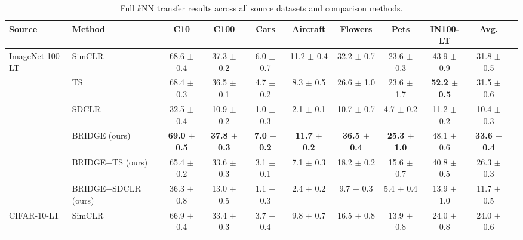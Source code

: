 \begin{table}[H]
\centering
\tiny
\setlength{\tabcolsep}{3.5pt}
\caption{Full $k$NN transfer results across all source datasets and comparison methods.}
\label{tab:app_sota_knn_full}
\begin{adjustbox}{width=\textwidth}
\begin{tabular}{l l c c c c c c c c c}
\toprule
Source & Method & C10 & C100 & Cars & Aircraft & Flowers & Pets & IN100-LT & Avg. \\
\midrule
ImageNet-100-LT & SimCLR & 68.6 {\scriptsize$\pm$ 0.4} & 37.3 {\scriptsize$\pm$ 0.2} & 6.0 {\scriptsize$\pm$ 0.7} & 11.2 {\scriptsize$\pm$ 0.4} & 32.2 {\scriptsize$\pm$ 0.7} & 23.6 {\scriptsize$\pm$ 0.3} & 43.9 {\scriptsize$\pm$ 0.9} & 31.8 {\scriptsize$\pm$ 0.5} \\
 & TS & 68.4 {\scriptsize$\pm$ 0.3} & 36.5 {\scriptsize$\pm$ 0.1} & 4.7 {\scriptsize$\pm$ 0.2} & 8.3 {\scriptsize$\pm$ 0.5} & 26.6 {\scriptsize$\pm$ 1.0} & 23.6 {\scriptsize$\pm$ 1.7} & \textbf{52.2 {\scriptsize$\pm$ 0.5}} & 31.5 {\scriptsize$\pm$ 0.6} \\
 & SDCLR & 32.5 {\scriptsize$\pm$ 0.4} & 10.9 {\scriptsize$\pm$ 0.2} & 1.0 {\scriptsize$\pm$ 0.3} & 2.1 {\scriptsize$\pm$ 0.1} & 10.7 {\scriptsize$\pm$ 0.7} & 4.7 {\scriptsize$\pm$ 0.2} & 11.2 {\scriptsize$\pm$ 0.2} & 10.4 {\scriptsize$\pm$ 0.3} \\
 & BRIDGE (ours) & \textbf{69.0 {\scriptsize$\pm$ 0.5}} & \textbf{37.8 {\scriptsize$\pm$ 0.3}} & \textbf{7.0 {\scriptsize$\pm$ 0.2}} & \textbf{11.7 {\scriptsize$\pm$ 0.2}} & \textbf{36.5 {\scriptsize$\pm$ 0.4}} & \textbf{25.3 {\scriptsize$\pm$ 1.0}} & 48.1 {\scriptsize$\pm$ 0.6} & \textbf{33.6 {\scriptsize$\pm$ 0.4}} \\
 & BRIDGE+TS (ours) & 65.4 {\scriptsize$\pm$ 0.2} & 33.6 {\scriptsize$\pm$ 0.3} & 3.1 {\scriptsize$\pm$ 0.1} & 7.1 {\scriptsize$\pm$ 0.3} & 18.2 {\scriptsize$\pm$ 0.2} & 15.6 {\scriptsize$\pm$ 0.7} & 40.8 {\scriptsize$\pm$ 0.5} & 26.3 {\scriptsize$\pm$ 0.3} \\
 & BRIDGE+SDCLR (ours) & 36.3 {\scriptsize$\pm$ 0.8} & 13.0 {\scriptsize$\pm$ 0.5} & 1.1 {\scriptsize$\pm$ 0.3} & 2.4 {\scriptsize$\pm$ 0.2} & 9.7 {\scriptsize$\pm$ 0.3} & 5.4 {\scriptsize$\pm$ 0.4} & 13.9 {\scriptsize$\pm$ 1.0} & 11.7 {\scriptsize$\pm$ 0.5} \\
\midrule
CIFAR-10-LT & SimCLR & 66.9 {\scriptsize$\pm$ 0.4} & 33.4 {\scriptsize$\pm$ 0.3} & 3.7 {\scriptsize$\pm$ 0.4} & 9.8 {\scriptsize$\pm$ 0.7} & 16.5 {\scriptsize$\pm$ 0.8} & 13.9 {\scriptsize$\pm$ 0.8} & 24.0 {\scriptsize$\pm$ 0.8} & 24.0 {\scriptsize$\pm$ 0.6} \\

\end{tabular}
\end{adjustbox}
\end{table}
